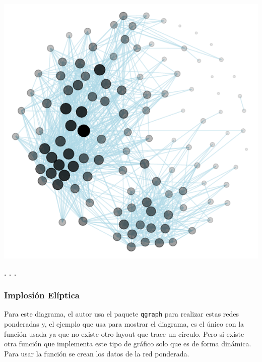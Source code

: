 \documentclass{article}\usepackage[]{graphicx}\usepackage[]{color}
\makeatletter
\def\maxwidth{ %
  \ifdim\Gin@nat@width>\linewidth
    \linewidth
  \else
    \Gin@nat@width
  \fi
}
\newenvironment{knitrout}{}{} %
\makeatother
\begin{document}
\begin{knitrout}
\color{fgcolor}

{\centering \includegraphics[width=\maxwidth]{figure/explo_red-1} 

}



\end{knitrout}
\begin{center}
\textbf{. . .}
\end{center}
\subsubsection{Implosi\'on El\'iptica}
Para este diagrama, el autor usa el paquete \texttt{qgraph} %
para realizar estas redes ponderadas y, el ejemplo que usa para mostrar el diagrama, es el \'unico con la funci\'on usada ya que no existe otro layout que trace un c\'irculo. Pero si existe otra funci\'on que implementa este tipo de gr\'afico solo que es de forma din\'amica.~\\
Para usar la funci\'on se crean los datos de la red ponderada.
\end{document}
